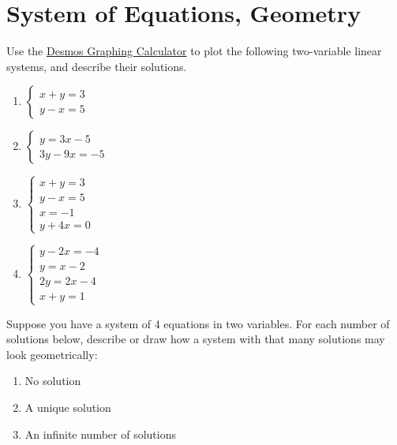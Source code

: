 \documentclass[11pt]{exam}
\begin{document}
\pagebreak
\section{System of Equations, Geometry}
    \begin{questions}
        \item Use the \href{https://www.desmos.com/calculator}{Desmos Graphing Calculator} to plot the following two-variable linear systems, and describe
        their solutions.
        \begin{enumerate}
            \item $\begin{cases}
                x + y = 3 \\
                y - x = 5
            \end{cases}$
            \item $\begin{cases}
                y = 3x - 5 \\ 
                3y -9x = - 5
            \end{cases}$
            \item $\begin{cases}
                x + y = 3 \\
                y - x = 5 \\
                x = -1 \\
                y + 4x = 0
            \end{cases}$
            \item $\begin{cases}
                y - 2x = -4 \\
                y = x - 2 \\
                2y = 2x - 4 \\
                x + y = 1
            \end{cases}$
        \end{enumerate}

        \item Suppose you have a system of 4 equations in two variables. For each number of solutions below, describe or draw how a system with that
        many solutions may look geometrically:
        \begin{enumerate}
            \item No solution
            \item A unique solution
            \item An infinite number of solutions
        \end{enumerate}
    \end{questions}
\end{document}
